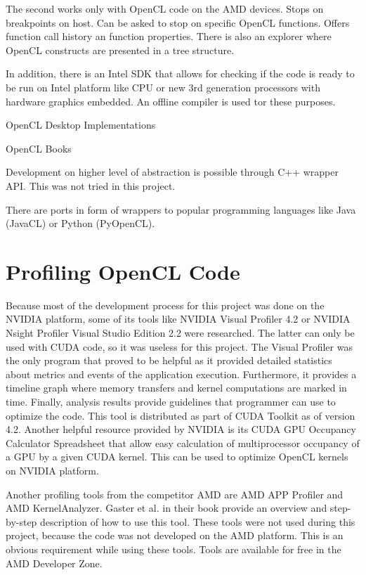 The second works only with OpenCL code on the AMD devices. Stops on breakpoints on host. Can be asked to stop on specific OpenCL functions. Offers function call history an function properties. There is also an explorer where OpenCL constructs are presented in a tree structure.

In addition, there is an Intel SDK that allows for checking if the code is ready to be run on Intel platform like CPU or new 3rd generation processors with hardware graphics embedded. An offline compiler is used tor these purposes. 

OpenCL Desktop Implementations


OpenCL Books


Development on higher level of abstraction is possible through C++ wrapper API. This was not tried in this project.

There are ports in form of wrappers to popular programming languages like Java (JavaCL) or Python (PyOpenCL).

\section{Profiling OpenCL Code}
Because most of the development process for this project was done on the NVIDIA platform, some of its tools like NVIDIA Visual Profiler 4.2 or NVIDIA Nsight Profiler Visual Studio Edition 2.2 were researched. The latter can only be used with CUDA code, so it was useless for this project. The Visual Profiler was the only program that proved to be helpful as it provided detailed statistics about metrics and events of the application execution. Furthermore, it provides a timeline graph where memory transfers and kernel computations are marked in time. Finally, analysis results provide guidelines that programmer can use to optimize the code. This tool is distributed as part of CUDA Toolkit as of version 4.2. 
Another helpful resource provided by NVIDIA is its CUDA GPU Occupancy Calculator Spreadsheet that allow easy calculation of multiprocessor occupancy of a GPU by a given CUDA kernel. This can be used to optimize OpenCL kernels on NVIDIA platform.

Another profiling tools from the competitor AMD are AMD APP Profiler and AMD KernelAnalyzer. Gaster et al. in their book\cite{gaster2011heterogeneous} provide an overview and step-by-step description of how to use this tool. These tools were not used during this project, because the code was not developed on the AMD platform. This is an obvious requirement while using these tools. Tools are available for free in the AMD Developer Zone.

